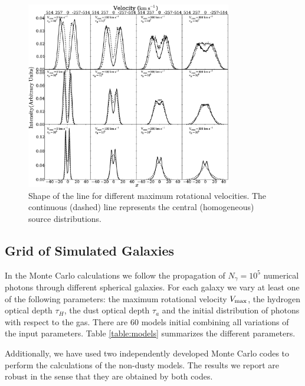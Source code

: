 \documentclass{emulateapj}
\newcommand{\ly}{{\ifmmode{{\rm Ly}\alpha~}\else{Ly$\alpha$~}\fi}}
\begin{document}
\begin{figure}
\begin{center}
  \includegraphics[width=0.8\textwidth]{f1.eps}
\end{center}
\caption{Shape of the \ly line for
    different maximum rotational velocities. The continuous (dashed)
    line represents the central (homogeneous) source distributions. 
    \label{fig:differentvelocities}}  
\end{figure}


\subsection{Grid of Simulated Galaxies}
\label{sec:models}

In the Monte Carlo calculations we follow the propagation of $N_{\gamma}=10^5$
numerical photons through different spherical galaxies. For each galaxy
we vary at least one of the following parameters: the maximum
rotational velocity $V_{\rm max}$, the hydrogen optical depth $\tau_{H}$,
the dust optical depth $\tau_{a}$ and the initial distribution of photons
with respect to the gas. There are $60$ models initial combining all
variations of the input parameters. Table \ref{table:models}
summarizes the different parameters.

Additionally, we have used two independently developed Monte Carlo
codes \citep{CLARA,DijkstraKramer} to perform the calculations of the
non-dusty models. The results we report are robust in the sense
that they are obtained by both codes. 
\end{document}
